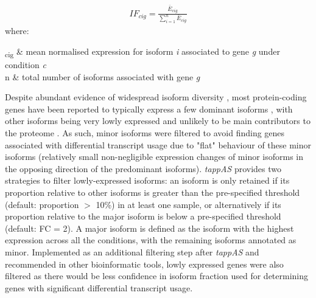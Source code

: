 \begin{myequation}[!h]
	\label{eqn:tappas_IF}
	\begin{align}
		IF_{cig} = \frac{\bar{E}_{cig}}{\sum_{i=1}^{n}\bar{E}_{cig}}
	\end{align}
	where:
	\begin{conditions*}
		\hspace{3mm}\textsubscript{cig} & mean normalised expression for isoform \textit{i} associated to gene \textit{g} under condition \textit{c}\\
		\hspace{3mm}n  & total number of isoforms associated with gene \textit{g}
	\end{conditions*}
\end{myequation}

Despite abundant evidence of widespread isoform diversity \cite{Wang2008}, most protein-coding genes have been reported to typically express a few dominant isoforms \cite{Gonzalez-Porta2013, Ezkurdia2015}, with other isoforms being very lowly expressed and unlikely to be main contributors to the proteome \cite{Gonzalez-Porta2013}. As such, minor isoforms were filtered to avoid finding genes associated with differential transcript usage due to "flat" behaviour of these minor isoforms \cite{DeLaFuente2020} (relatively small non-negligible expression changes of minor isoforms in the opposing direction of the predominant isoforms). \textit{tappAS} provides two strategies to filter lowly-expressed isoforms: an isoform is only retained if its proportion relative to other isoforms is greater than the pre-specified threshold (default: proportion $>$ 10\%) in at least one sample, or alternatively if its proportion relative to the major isoform is below a pre-specified threshold (default: FC = 2). A major isoform is defined as the isoform with the highest expression across all the conditions, with the remaining isoforms annotated as minor. Implemented as an additional filtering step after \textit{tappAS} and recommended in other bioinformatic tools\cite{Vitting-Seerup2017}, lowly expressed genes were also filtered as there would be less confidence in isoform fraction used for determining genes with significant differential transcript usage.   